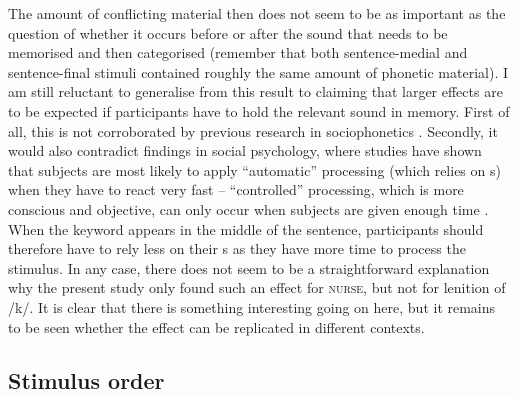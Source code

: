 The amount of conflicting material then does not seem to be as important as the question of whether it occurs before or after the sound that needs to be memorised and then categorised (remember that both sentence-medial and sentence-final stimuli contained roughly the same amount of phonetic material).
I am still reluctant to generalise from this result to claiming that larger  effects are to be expected if participants have to hold the relevant sound in memory.
First of all, this is not corroborated by previous research in sociophonetics \parencite{hayetal2006a,haydrager2010}.
Secondly, it would also contradict findings in social psychology, where studies have shown that subjects are most likely to apply ``automatic'' processing (which relies on s) when they have to react very fast -- ``controlled'' processing, which is more conscious and objective, can only occur when subjects are given enough time \parencite[cf.][33--34]{petersensix2008}.
When the keyword appears in the middle of the sentence, participants should therefore have to rely less on their s as they have more time to process the stimulus.
In any case, there does not seem to be a straightforward explanation why the present study only found such an effect for \textsc{nurse}, but not for lenition of /k/.
It is clear that there is something interesting going on here, but it remains to be seen whether the effect can be replicated in different contexts.

		\subsection{Stimulus order}

